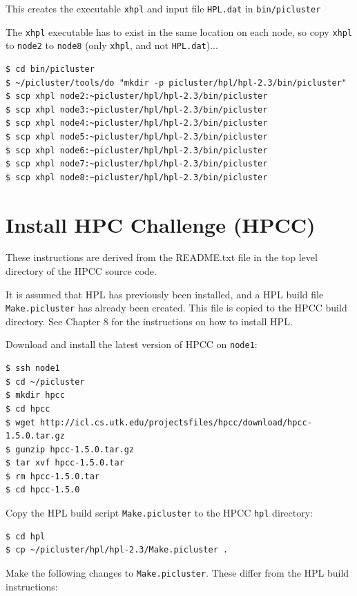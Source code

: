 \documentclass{report}
\begin{document}
This creates the executable \verb|xhpl| and input file \verb|HPL.dat| in \verb|bin/picluster|

The \verb|xhpl| executable has to exist in the same location on each node, so copy \verb|xhpl| to \verb|node2| to \verb|node8| (only \verb|xhpl|, and not \verb|HPL.dat|)...

\lstset{style=type}
\begin{lstlisting}
$ cd bin/picluster
$ ~/picluster/tools/do "mkdir -p picluster/hpl/hpl-2.3/bin/picluster"
$ scp xhpl node2:~picluster/hpl/hpl-2.3/bin/picluster
$ scp xhpl node3:~picluster/hpl/hpl-2.3/bin/picluster
$ scp xhpl node4:~picluster/hpl/hpl-2.3/bin/picluster
$ scp xhpl node5:~picluster/hpl/hpl-2.3/bin/picluster
$ scp xhpl node6:~picluster/hpl/hpl-2.3/bin/picluster
$ scp xhpl node7:~picluster/hpl/hpl-2.3/bin/picluster
$ scp xhpl node8:~picluster/hpl/hpl-2.3/bin/picluster
\end{lstlisting}


%
%
\chapter{Install HPC Challenge (HPCC)}

These instructions are derived from the README.txt file in the top level directory of the HPCC source code.

It is assumed that HPL has previously been installed, and a HPL build file \verb|Make.picluster| has already been created. This file is copied to the HPCC build directory. See Chapter 8 for the instructions on how to install HPL.

Download and install the latest version of HPCC on \verb|node1|:

\lstset{style=type}
\begin{lstlisting}
$ ssh node1
$ cd ~/picluster
$ mkdir hpcc
$ cd hpcc
$ wget http://icl.cs.utk.edu/projectsfiles/hpcc/download/hpcc-1.5.0.tar.gz
$ gunzip hpcc-1.5.0.tar.gz
$ tar xvf hpcc-1.5.0.tar
$ rm hpcc-1.5.0.tar
$ cd hpcc-1.5.0
\end{lstlisting}

Copy the HPL build script \verb|Make.picluster| to the HPCC \verb|hpl| directory:

\lstset{style=type}
\begin{lstlisting}
$ cd hpl
$ cp ~/picluster/hpl/hpl-2.3/Make.picluster .
\end{lstlisting}

Make the following changes to \verb|Make.picluster|. These differ from the HPL build instructions:
\end{document}
